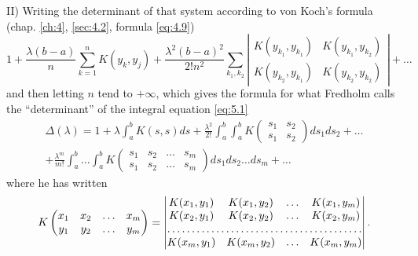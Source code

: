 \documentclass[12pt,a4paper,leqno,twoside]{extbook}
\begin{document}
II) Writing the determinant of that system according to von Koch's formula (chap. \ref{ch:4}, \ref{sec:4.2}, formula \eqref{eq:4.9})
\[
    1 + \frac{\lambda (b-a)}{n} \sum_{k=1}^n K(y_k, y_j) + \frac{\lambda^2 (b-a)^2}{2!n^2} \sum_{k_1, k_2}
    \left|
    \begin{matrix}
        K(y_{k_1}, y_{k_1}) & K(y_{k_1}, y_{k_2}) \\
        K(y_{k_2}, y_{k_1}) & K(y_{k_2}, y_{k_2})
    \end{matrix}
    \right|
    + \ldots
\]
and then letting \(n\) tend to \(+\infty\), which gives the formula for what Fredholm calls the ``determinant'' of the integral equation \eqref{eq:5.1}
\begin{equation}
    \label{eq:5.3}
    \begin{gathered}
        \Delta(\lambda) = 1 + \lambda \int_a^b K(s, s)ds + \frac{\lambda^2}{2!} \int_a^b \int_a^b K
        \left(
        \begin{matrix}
            s_1 & s_2 \\
            s_1 & s_2
        \end{matrix}
        \right) ds_1 ds_2
        + \ldots \\
        + \frac{\lambda^m}{m!} \int_a^b \ldots \int_a^b K
        \left(
        \begin{matrix}
            s_1 & s_2 & \ldots & s_m \\
            s_1 & s_2 & \ldots & s_m
        \end{matrix}
        \right) ds_1 ds_2 \ldots ds_m
        + \ldots
    \end{gathered}
\end{equation}
where he has written
\begin{equation}
    \label{eq:5.4}
    K
    \left(
    \begin{matrix}
        x_1 & x_2 & \ldots & x_m \\
        y_1 & y_2 & \ldots & y_m
    \end{matrix}
    \right)
    =
    \left|
    \begin{matrix}
        K(x_1, y_1) & K(x_1, y_2) & \ldots & K(x_1, y_m) \\
        K(x_2, y_1) & K(x_2, y_2) & \ldots & K(x_2, y_m) \\
        \hdotsfor{4} \\
        K(x_m, y_1) & K(x_m, y_2) & \ldots & K(x_m, y_m)
    \end{matrix}
    \right|
    .
\end{equation}
\end{document}
